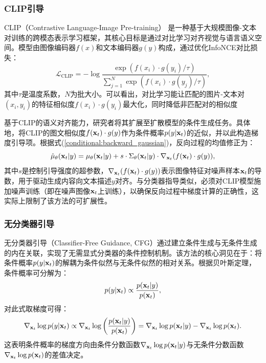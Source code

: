 \documentclass[11pt,a4paper,UTF8]{ctexart}
\begin{document}
\subsubsection{CLIP引导}

CLIP（Contrastive Language-Image Pre-training）\cite{radford2021learning} 是一种基于大规模图像-文本对训练的跨模态表示学习框架，其核心目标是通过对比学习对齐视觉与语言语义空间。模型由图像编码器$f(x)$和文本编码器$g(y)$构成，通过优化InfoNCE对比损失\cite{oord2018representation}：
\begin{equation*}
\mathcal{L}_{\text{CLIP}} = -\log \frac{\exp(f(x_i)\cdot g(y_i)/\tau)}{\sum_{j=1}^N \exp(f(x_i)\cdot g(y_j)/\tau)},
\end{equation*}
其中$\tau$是温度系数，$N$为批大小。可以看出，对比学习能让匹配的图片-文本对$(x_i,y_i)$的特征相似度$f(x_i)\cdot g(y_i)$最大化，同时降低非匹配对的相似度

基于CLIP的语义对齐能力，研究者将其扩展至扩散模型的条件生成任务\cite{clip-guide-1,Patashnik_2021_ICCV,gal2022StyleGAN}。具体地，将CLIP的图文相似度$f(\mathbf{x}_t)\cdot g(y)$作为条件概率$p(y|\mathbf{x}_t)$的近似，并以此构造梯度引导项。根据式(\ref{conditional:backward_gaussian})，反向过程的均值修正为：
\begin{equation}
\hat{\mu}_{\theta}(\mathbf{x}_t|y)=\mu_{\theta}(\mathbf{x}_t|y) + s\cdot\Sigma_\theta(\mathbf{x}_t|y)\cdot\nabla_{\mathbf{x}_t}(f(\mathbf{x}_t)\cdot g(y)),
\label{conditional_clip_guided}
\end{equation}
其中$s$是控制引导强度的超参数，$\nabla_{\mathbf{x}_t}(f(\mathbf{x}_t)\cdot g(y))$表示图像特征对噪声样本$\mathbf{x}_t$的导数，用于驱动生成内容向文本描述$y$对齐。与分类器指导类似，必须对CLIP模型施加噪声训练（即在噪声图像$\mathbf{x}_t$上训练），以确保反向过程中梯度计算的正确性，这实际上限制了该方法的可扩展性。

\subsubsection{无分类器引导}

无分类器引导（Classifier-Free Guidance, CFG）\cite{ho2022classifier}通过建立条件生成与无条件生成的内在关联，实现了无需显式分类器的条件控制机制。该方法的核心洞见在于：将条件概率$p(y|\mathbf{x}_t)$的解耦为条件似然与无条件似然的相对关系。根据贝叶斯定理，条件概率可分解为：
\begin{equation*}
    p(y|\mathbf{x}_t) \propto \frac{p(\mathbf{x}_t|y)}{p(\mathbf{x}_t)},
\end{equation*}
对此式取梯度可得：
\begin{equation}
    \nabla_{\mathbf{x}_t}\log p(y|\mathbf{x}_t) \propto \nabla_{\mathbf{x}_t}\log \left(\frac{p(\mathbf{x}_t|y)}{p(\mathbf{x}_t)}\right) = \nabla_{\mathbf{x}_t}\log p(\mathbf{x}_t|y) -\nabla_{\mathbf{x}_t}\log p(\mathbf{x}_t).
\label{cfg_gradient_relation}
\end{equation}
这表明条件概率的梯度方向由条件分数函数$\nabla_{\mathbf{x}_t}\log p(\mathbf{x}_t|y)$与无条件分数函数$\nabla_{\mathbf{x}_t}\log p(\mathbf{x}_t)$的差值决定。
\end{document}
